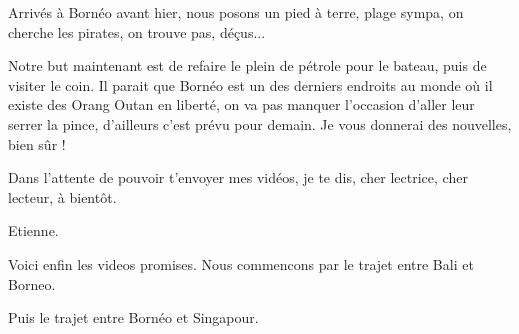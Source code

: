 \begin{multicols}{2}
Arrivés à Bornéo avant hier, nous posons un pied à terre, plage sympa, on cherche les pirates, on trouve pas, déçus...

Notre but maintenant est de refaire le plein de pétrole pour le bateau, puis de visiter le coin. Il parait que Bornéo est un des derniers endroits au monde où il existe des Orang Outan en liberté, on va pas manquer l'occasion d'aller leur serrer la pince, d'ailleurs c'est prévu pour demain. Je vous donnerai des nouvelles, bien sûr !

Dans l'attente de pouvoir t'envoyer mes vidéos, je te dis, cher lectrice, cher lecteur, à bientôt.

Etienne.

Voici enfin les videos promises. Nous commencons par le trajet entre Bali et Borneo.



Puis le trajet entre Bornéo et Singapour.



\end{multicols}


